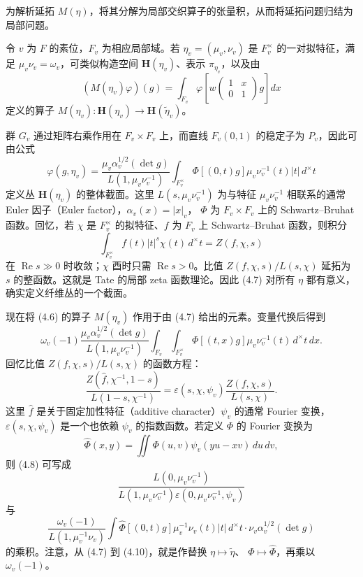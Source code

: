 为解析延拓 $M(\eta)$，将其分解为局部交织算子的张量积，从而将延拓问题归结为局部问题。

令 $v$ 为 $F$ 的素位，$F_v$ 为相应局部域。若 $\eta_v=(\mu_v,\nu_v)$ 是 $F_v^\times$ 的一对拟特征，满足 $\mu_v\nu_v=\omega_v$，可类似构造空间 $\mathbf H(\eta_v)$、表示
$\pi_{\eta_v}$，以及由
\begin{equation}
 (M(\eta_v)\varphi)(g)=\int_{F_v}
 \varphi\!\left[w\begin{pmatrix}1&x\\0&1\end{pmatrix}g\right]dx\tag{4.6}
\end{equation}
定义的算子 $M(\eta_v):\mathbf H(\eta_v)\to\mathbf H(\widetilde\eta_v)$。

群 $G_v$ 通过矩阵右乘作用在 $F_v\times F_v$ 上，而直线 $F_v(0,1)$ 的稳定子为 $P_v$，因此可由公式
\begin{equation}
 \varphi(g,\eta_v)=\frac{\mu_v\alpha_v^{1/2}(\det g)}{L(1,\mu_v\nu_v^{-1})}
 \int_{F_v^\times}\Phi[(0,t)g]\mu_v\nu_v^{-1}(t)|t|\,d^\times t\tag{4.7}
\end{equation}
定义丛 $\mathbf H(\eta_v)$ 的整体截面。这里 $L(s,\mu_v\nu_v^{-1})$ 为与特征
$\mu_v\nu_v^{-1}$ 相联系的通常 Euler 因子（Euler factor），$\alpha_v(x)=|x|_v$，
$\Phi$ 为 $F_v\times F_v$ 上的 Schwartz--Bruhat 函数。回忆，若 $\chi$ 是 $F_v^\times$ 的拟特征、$f$ 为 $F_v$ 上 Schwartz--Bruhat 函数，则积分
\[
 \int_{F_v^\times}f(t)|t|^s\chi(t)\,d^\times t=Z(f,\chi,s)
\]
在 $\operatorname{Re}s\gg0$ 时收敛；$\chi$ 酉时只需 $\operatorname{Re}s>0$。比值
$Z(f,\chi,s)/L(s,\chi)$ 延拓为 $s$ 的整函数。这就是 Tate 的局部 zeta 函数理论。因此
(4.7) 对所有 $\eta$ 都有意义，确实定义纤维丛的一个截面。

现在将 (4.6) 的算子 $M(\eta_v)$ 作用于由 (4.7) 给出的元素。变量代换后得到
\begin{equation}
 \omega_v(-1)\frac{\mu_v\alpha_v^{1/2}(\det g)}{L(1,\mu_v\nu_v^{-1})}
 \int_{F_v}\int_{F_v^\times}\Phi[(t,x)g]\mu_v\nu_v^{-1}(t)\,d^\times t\,dx.\tag{4.8}
\end{equation}
回忆比值 $Z(f,\chi,s)/L(s,\chi)$ 的函数方程：
\[
 \frac{Z(\widehat f,\chi^{-1},1-s)}{L(1-s,\chi^{-1})}
 =\varepsilon(s,\chi,\psi_v)\frac{Z(f,\chi,s)}{L(s,\chi)}.
\]
这里 $\widehat f$ 是关于固定加性特征（additive character）$\psi_v$ 的通常 Fourier 变换，
$\varepsilon(s,\chi,\psi_v)$ 是一个也依赖 $\psi_v$ 的指数函数。若定义 $\Phi$ 的 Fourier 变换为
\[
 \widehat\Phi(x,y)=\iint\Phi(u,v)\psi_v(yu-xv)\,du\,dv,
\]
则 (4.8) 可写成
\begin{equation}
 \frac{L(0,\mu_v\nu_v^{-1})}
 {L(1,\mu_v\nu_v^{-1})\varepsilon(0,\mu_v\nu_v^{-1},\psi_v)}\tag{4.9}
\end{equation}
与
\begin{equation}
 \frac{\omega_v(-1)}{L(1,\mu_v^{-1}\nu_v)}
 \int\widehat\Phi[(0,t)g]\mu_v^{-1}\nu_v(t)|t|\,d^\times t
 \cdot\nu_v\alpha_v^{1/2}(\det g)\tag{4.10}
\end{equation}
的乘积。注意，从 (4.7) 到 (4.10)，就是作替换 $\eta\mapsto\widetilde\eta$、
$\Phi\mapsto\widehat\Phi$，再乘以 $\omega_v(-1)$。

